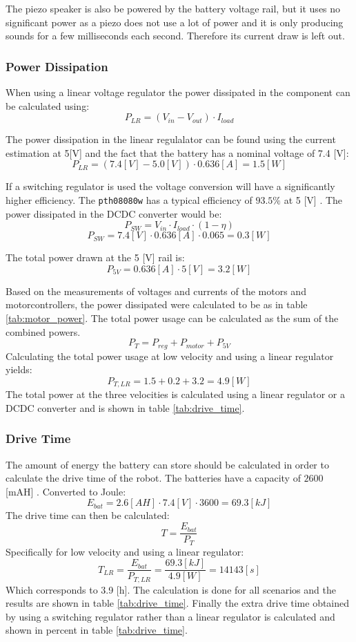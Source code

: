 The piezo speaker is also be powered by the battery voltage rail, but it uses no significant power as a piezo does not use a lot of power and it is only producing sounds for a few milliseconds each second. 
Therefore its current draw is left out.

\subsubsection*{Power Dissipation} %
\label{sec:power_dissipation}
When using a linear voltage regulator the power dissipated in the component can be calculated using:
$$P_{LR} = (V_{in} - V_{out}) \cdot I_{load}$$

The power dissipation in the linear regulalator can be found using the current estimation at 5[V] and the fact that the battery has a nominal voltage of 7.4 [V]:
$$P_{LR} = (7.4 [V] - 5.0 [V]) \cdot 0.636 [A] = 1.5 [W]$$

If a switching regulator is used the voltage conversion will have a significantly higher efficiency.
The \texttt{pth08080w} has a typical efficiency of $93.5\%$ at 5 [V] \cite{pth08080}.
The power dissipated in the DCDC converter would be:
$$P_{SW} = V_{in} \cdot I_{load} \cdot (1 - \eta) $$
$$P_{SW} = 7.4 [V] \cdot 0.636 [A] \cdot 0.065 = 0.3 [W]$$


The total power drawn at the 5 [V] rail is:
$$P_{5V} = 0.636 [A] \cdot 5 [V] = 3.2 [W]$$

Based on the measurements of voltages and currents of the motors and motorcontrollers, the power dissipated were calculated to be as in table \ref{tab:motor_power}.
The total power usage can be calculated as the sum of the combined powers.
$$P_{T} = P_{reg} + P_{motor} + P_{5V}$$ 
Calculating the total power usage at low velocity and using a linear regulator yields:
$$P_{T,LR} = 1.5 + 0.2 + 3.2 = 4.9 [W]$$ 
The total power at the three velocities is calculated using a linear regulator or a DCDC converter and is shown in table \ref{tab:drive_time}. 

\subsubsection*{Drive Time}
The amount of energy the battery can store should be calculated in order to calculate the drive time of the robot.
The batteries have a capacity of $2600$ [mAH] \cite{battery}.
Converted to Joule: 
$$ E_{bat} = 2.6 [AH] \cdot 7.4 [V]  \cdot 3600 = 69.3 [kJ]$$
The drive time can then be calculated: 
$$ T = \frac{E_{bat}}{P_T} $$
Specifically for low velocity and using a linear regulator:
$$ T_{LR} = \frac{E_{bat}}{P_{T,LR}} = \frac{69.3 [kJ]}{4.9 [W]} = 14143 [s] $$
Which corresponds to 3.9 [h]. The calculation is done for all scenarios and the results are shown in table \ref{tab:drive_time}.
Finally the extra drive time obtained by using a switching regulator rather than a linear regulator is calculated and shown in percent in table \ref{tab:drive_time}.

